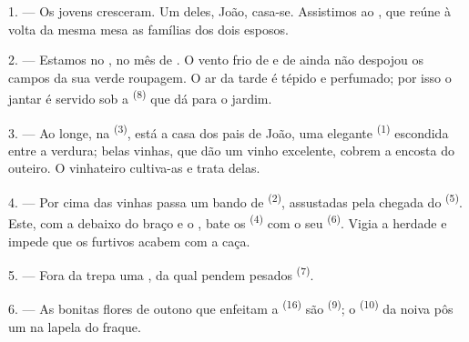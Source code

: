 %

\VUsaut{4.0mm}
\VUsaut{1.6mm}
\VUsaut{3.2mm}

\VUsaut{1.6mm}
\VUsaut{2.6mm}

\VUsaut{3.0mm}

1. --- Os jovens cresceram. Um deles, João, casa-se. Assistimos ao
, que reúne à volta da mesma mesa as
famílias dos dois esposos.

2. --- Estamos no , no mês de . O vento frio
de  e de  ainda não despojou os campos da
sua verde roupagem. O ar da tarde é tépido e perfumado; por isso o jantar
é servido sob a  \textsuperscript{(8)} que dá para o jardim.

3. --- Ao longe, na  \textsuperscript{(3)}, está a casa dos pais de
João, uma elegante  \textsuperscript{(1)} escondida entre a
verdura; belas vinhas, que dão um vinho excelente, cobrem a encosta do
outeiro. O vinhateiro cultiva-as e trata delas.

4. --- Por cima das vinhas passa um bando de 
\textsuperscript{(2)}, assustadas pela chegada do 
\textsuperscript{(5)}. Este, com a  debaixo do braço e o
, bate os  \textsuperscript{(4)} com o
seu  \textsuperscript{(6)}. Vigia a herdade e impede que os furtivos
acabem com a caça.

5. --- Fora da  trepa uma , da qual pendem
pesados  \textsuperscript{(7)}.

6. --- As bonitas flores de outono que enfeitam a 
\textsuperscript{(16)} são  \textsuperscript{(9)}; o 
\textsuperscript{(10)} da noiva pôs um na lapela do fraque.

